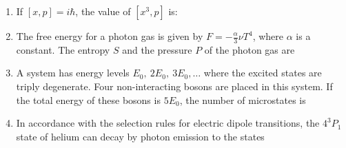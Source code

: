 \documentclass[journal,12pt,onecolumn]{IEEEtran}
\begin{document}
\begin{enumerate}[itemsep = 1em]
\item If $[x, p] = i \hbar$, the value of $[x^{3}, p]$ is:

\hfill{}

\begin{enumerate}
\end{enumerate}

\item The free energy for a photon gas is given by $F = -\frac{\alpha}{3} \nu T^{4}$, where $\alpha$ is a constant. The entropy $S$ and the pressure $P$ of the photon gas are

\hfill{}
\begin{enumerate}
\end{enumerate}

\item A system has energy levels $E_{0}, \ 2E_{0}, \ 3E_{0}, \dots$ where the excited states are triply degenerate. Four non-interacting bosons are placed in this system. If the total energy of these bosons is $5E_{0}$, the number of microstates is

\hfill{}
\begin{enumerate}
\end{enumerate}

\item In accordance with the selection rules for electric dipole transitions, the $4^{3}P_{1}$ state of helium can decay by photon emission to the states


\end{enumerate}
\end{document}
